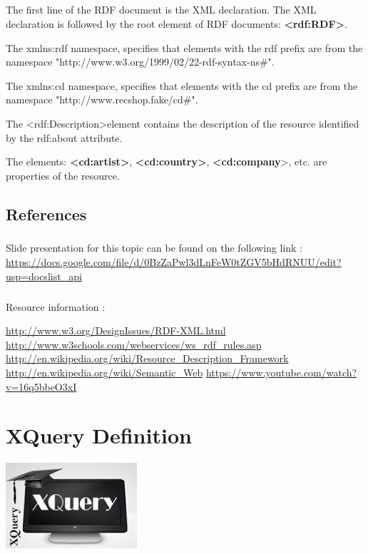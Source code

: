 \documentclass[a4paper,11pt]{report}
\begin{document}
\paragraph{}
The first line of the RDF document is the XML declaration. The XML declaration is followed by the root element of RDF documents: \textbf{\textless rdf:RDF\textgreater}.

The xmlns:rdf namespace, specifies that elements with the rdf prefix are from the namespace "http://www.w3.org/1999/02/22-rdf-syntax-ns\#".

The xmlns:cd namespace, specifies that elements with the cd prefix are from the namespace "http://www.recshop.fake/cd\#".

The \textless rdf:Description\textgreater element contains the description of the resource identified by the rdf:about attribute.

The elements: \textbf{\textless cd:artist\textgreater}, \textbf{\textless cd:country\textgreater}, \textbf{\textless cd:company}\textgreater, etc. are properties of the resource.





\section{References}
\paragraph{}
Slide presentation for this topic can be found on the following link : \url{https://docs.google.com/file/d/0BzZaPwl3dLnFeW0tZGV5bHdRNUU/edit?usp=docslist_api}

\paragraph{}
Resource information : 

\url{http://www.w3.org/DesignIssues/RDF-XML.html}
\url{http://www.w3schools.com/webservices/ws_rdf_rules.asp}
\url{http://en.wikipedia.org/wiki/Resource_Description_Framework}
\url{http://en.wikipedia.org/wiki/Semantic_Web}
\url{https://www.youtube.com/watch?v=16q5bbeO3xI}

\chapter{XQuery Definition}

\begin{center}
\includegraphics{images/xquery_image.jpeg}~\\[1cm]

\end{center}
\end{document}
